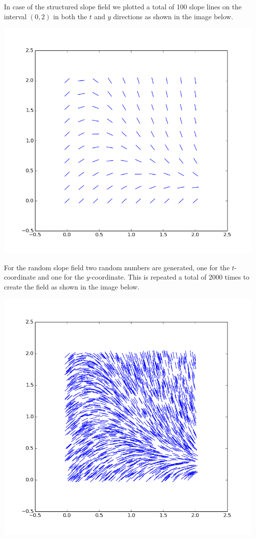 \documentclass[a4paper,12px]{article}
\begin{document}
In case of the structured slope field we plotted a total of 100 slope lines on
the interval $(0,2)$ in both the $t$ and $y$ directions as shown in the image
below.
\begin{center}
    \includegraphics[width=\textwidth]{slopefield}
\end{center}

For the random slope field two random numbers are generated, one for the
$t$-coordinate and one for the $y$-coordinate. This is repeated a total of 2000
times to create the field as shown in the image below.
\begin{center}
    \includegraphics[width=\textwidth]{randomfield}
\end{center}
\end{document}
